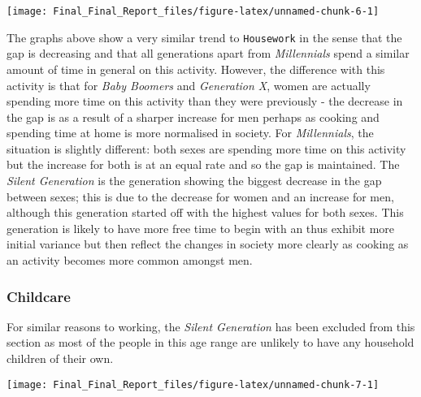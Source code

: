 \documentclass[11pt,]{article}
\begin{document}
\texttt{[image: Final\_Final\_Report\_files/figure-latex/unnamed-chunk-6-1]}

The graphs above show a very similar trend to \texttt{Housework} in the
sense that the gap is decreasing and that all generations apart from
\emph{Millennials} spend a similar amount of time in general on this
activity. However, the difference with this activity is that for
\emph{Baby Boomers} and \emph{Generation X}, women are actually spending
more time on this activity than they were previously - the decrease in
the gap is as a result of a sharper increase for men perhaps as cooking
and spending time at home is more normalised in society. For
\emph{Millennials}, the situation is slightly different: both sexes are
spending more time on this activity but the increase for both is at an
equal rate and so the gap is maintained. The \emph{Silent Generation} is
the generation showing the biggest decrease in the gap between sexes;
this is due to the decrease for women and an increase for men, although
this generation started off with the highest values for both sexes. This
generation is likely to have more free time to begin with an thus
exhibit more initial variance but then reflect the changes in society
more clearly as cooking as an activity becomes more common amongst men.

\hypertarget{childcare}{%
\subsubsection{Childcare}\label{childcare}}

For similar reasons to working, the \emph{Silent Generation} has been
excluded from this section as most of the people in this age range are
unlikely to have any household children of their own.

\texttt{[image: Final\_Final\_Report\_files/figure-latex/unnamed-chunk-7-1]}
\end{document}

